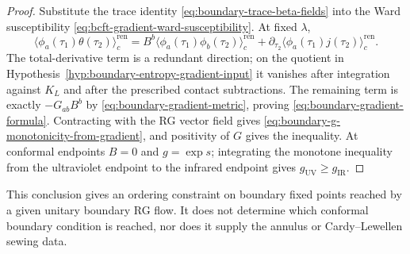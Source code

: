\begin{proof}
Substitute the trace identity
\eqref{eq:boundary-trace-beta-fields} into the Ward susceptibility
\eqref{eq:bcft-gradient-ward-susceptibility}.  At fixed \(\lambda\),
\[
  \bigl\langle\phi_a(\tau_1)\theta(\tau_2)\bigr\rangle_c^{\mathrm{ren}}
  =
  B^b
  \bigl\langle\phi_a(\tau_1)\phi_b(\tau_2)\bigr\rangle_c^{\mathrm{ren}}
  +
  \partial_{\tau_2}
  \bigl\langle\phi_a(\tau_1)j(\tau_2)\bigr\rangle_c^{\mathrm{ren}} .
\]
The total-derivative term is a redundant direction; on the quotient in
Hypothesis~\ref{hyp:boundary-entropy-gradient-input} it vanishes after
integration against \(K_L\) and after the prescribed contact subtractions.
The remaining term is exactly
\(-G_{ab}B^b\) by \eqref{eq:boundary-gradient-metric}, proving
\eqref{eq:boundary-gradient-formula}.  Contracting with the RG vector field
gives \eqref{eq:boundary-g-monotonicity-from-gradient}, and positivity of
\(G\) gives the inequality.  At conformal endpoints \(B=0\) and
\(g=\exp s\); integrating the monotone inequality from the ultraviolet endpoint
to the infrared endpoint gives \(g_{\mathrm{UV}}\ge g_{\mathrm{IR}}\).
\end{proof}

This conclusion gives an ordering constraint on boundary fixed points reached
by a given unitary boundary RG flow.  It does not determine which conformal
boundary condition is reached, nor does it supply the annulus or
Cardy--Lewellen sewing data.

